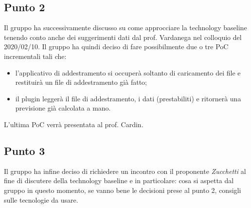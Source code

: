     \subsection{Punto 2}
        Il gruppo ha successivamente discusso su come approcciare la technology baseline tenendo conto anche dei suggerimenti dati dal prof. Vardanega nel colloquio del 2020/02/10. Il gruppo ha quindi deciso di fare possibilmente due o tre PoC incrementali tali che:
        \begin{itemize}
        	\item l’applicativo di addestramento si occuperà soltanto di caricamento dei file e restituirà un file di addestramento già fatto;
        	\item il plugin leggerà il file di addestramento, i dati (prestabiliti) e ritornerà una previsione già calcolata a mano.
        \end{itemize}
    	L'ultima PoC verrà presentata al prof. Cardin.
       
     \subsection{Punto 3}
       Il gruppo ha infine deciso di richiedere un incontro con il proponente \textit{Zucchetti} al fine di discutere della technology baseline e in particolare: cosa si aspetta dal gruppo in questo momento, se vanno bene le decisioni prese al punto 2, consigli sulle tecnologie da usare.